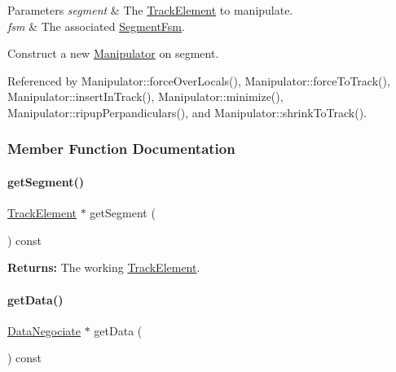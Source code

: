 \begin{DoxyParams}{Parameters}
{\em segment} & The \hyperlink{classKite_1_1TrackElement}{Track\+Element} to manipulate. \\
\hline
{\em fsm} & The associated \hyperlink{classKite_1_1SegmentFsm}{Segment\+Fsm}.\\
\hline
\end{DoxyParams}
Construct a new \hyperlink{classKite_1_1Manipulator}{Manipulator} on {\ttfamily segment}. 

Referenced by Manipulator\+::force\+Over\+Locals(), Manipulator\+::force\+To\+Track(), Manipulator\+::insert\+In\+Track(), Manipulator\+::minimize(), Manipulator\+::ripup\+Perpandiculars(), and Manipulator\+::shrink\+To\+Track().



\subsubsection{Member Function Documentation}
\mbox{\label{classKite_1_1Manipulator_a506a4d1cef59fc35984c1c88e0c0f6df}} 
\paragraph{\texorpdfstring{get\+Segment()}{getSegment()}}
{\footnotesize\ttfamily \hyperlink{classKite_1_1TrackElement}{Track\+Element} $\ast$ get\+Segment (\begin{DoxyParamCaption}{ }\end{DoxyParamCaption}) const\hspace{0.3cm}{\ttfamily [inline]}}

{\bfseries Returns\+:} The working \hyperlink{classKite_1_1TrackElement}{Track\+Element}. \mbox{\label{classKite_1_1Manipulator_a54ca9d3c6d8ea145e053a37be8be8753}} 
\paragraph{\texorpdfstring{get\+Data()}{getData()}}
{\footnotesize\ttfamily \hyperlink{classKite_1_1DataNegociate}{Data\+Negociate} $\ast$ get\+Data (\begin{DoxyParamCaption}{ }\end{DoxyParamCaption}) const\hspace{0.3cm}{\ttfamily [inline]}}

